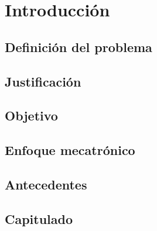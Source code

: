 
\chapter{Introducción}


\section{Definición del problema}


\section{Justificación}


\section{Objetivo}

\section{Enfoque mecatrónico}



\section{Antecedentes}


\section{Capitulado}    %




\endinput 